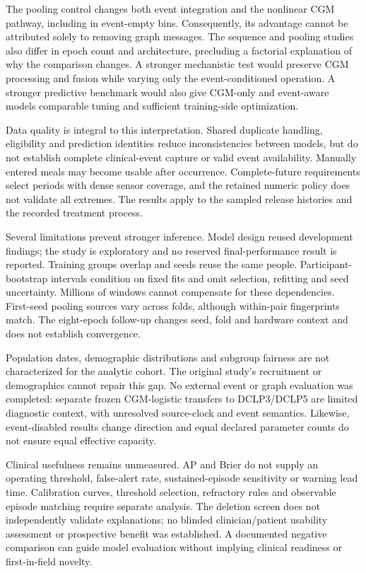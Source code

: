 \documentclass[11pt,a4paper]{article}
\begin{document}
The pooling control changes both event integration and the nonlinear CGM pathway, including in event-empty bins. Consequently, its advantage cannot be attributed solely to removing graph messages. The sequence and pooling studies also differ in epoch count and architecture, precluding a factorial explanation of why the comparison changes. A stronger mechanistic test would preserve CGM processing and fusion while varying only the event-conditioned operation. A stronger predictive benchmark would also give CGM-only and event-aware models comparable tuning and sufficient training-side optimization.

Data quality is integral to this interpretation. Shared duplicate handling, eligibility and prediction identities reduce inconsistencies between models, but do not establish complete clinical-event capture or valid event availability. Manually entered meals may become usable after occurrence. Complete-future requirements select periods with dense sensor coverage, and the retained numeric policy does not validate all extremes. The results apply to the sampled release histories and the recorded treatment process.

Several limitations prevent stronger inference. Model design reused development findings; the study is exploratory and no reserved final-performance result is reported. Training groups overlap and seeds reuse the same people. Participant-bootstrap intervals condition on fixed fits and omit selection, refitting and seed uncertainty. Millions of windows cannot compensate for these dependencies. First-seed pooling sources vary across folds, although within-pair fingerprints match. The eight-epoch follow-up changes seed, fold and hardware context and does not establish convergence.

Population dates, demographic distributions and subgroup fairness are not characterized for the analytic cohort. The original study's recruitment or demographics cannot repair this gap. No external event or graph evaluation was completed: separate frozen CGM-logistic transfers to DCLP3/DCLP5 are limited diagnostic context, with unresolved source-clock and event semantics. Likewise, event-disabled results change direction and equal declared parameter counts do not ensure equal effective capacity.

Clinical usefulness remains unmeasured. AP and Brier do not supply an operating threshold, false-alert rate, sustained-episode sensitivity or warning lead time. Calibration curves, threshold selection, refractory rules and observable episode matching require separate analysis. The deletion screen does not independently validate explanations; no blinded clinician/patient usability assessment or prospective benefit was established. A documented negative comparison can guide model evaluation without implying clinical readiness or first-in-field novelty.
\end{document}
